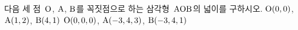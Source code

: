 다음 세 점~$\mathrm{O}$, $\mathrm{A}$, $\mathrm{B}$를 꼭짓점으로 하는 삼각형~$\mathrm{AOB}$의 넓이를 구하시오.
 $\mathrm{O}(0{,}\mkern3mu\mathopen{}0)$, $\mathrm{A}(1{,}\mkern3mu\mathopen{}2)$, $\mathrm{B}(4{,}\mkern3mu\mathopen{}1)$
 $\mathrm{O}(0{,}\mkern3mu\mathopen{}0{,}\mkern3mu\mathopen{}0)$, $\mathrm{A}(-3{,}\mkern3mu\mathopen{}4{,}\mkern3mu\mathopen{}3)$, $\mathrm{B}(-3{,}\mkern3mu\mathopen{}4{,}\mkern3mu\mathopen{}1)$
